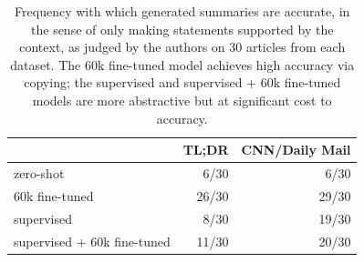 \begin{table}[t]
\centering
\begin{tabular}{l|r|r} \toprule
  & TL;DR & CNN/Daily Mail \\ 
  \midrule

zero-shot
& 6/30 & 6/30
\\

60k fine-tuned
& 26/30 & 29/30
\\

supervised
& 8/30 & 19/30
\\

supervised + 60k fine-tuned
& 11/30 & 20/30
\\

\bottomrule
\end{tabular}
\caption{Frequency with which generated summaries are accurate, in the sense of only making statements supported by the context, as judged by the authors on 30 articles from each dataset. 
The 60k fine-tuned model achieves high accuracy via copying;
the supervised and supervised + 60k fine-tuned models are more abstractive but at significant cost to accuracy.
\label{tab:accuracy}}
\end{table}